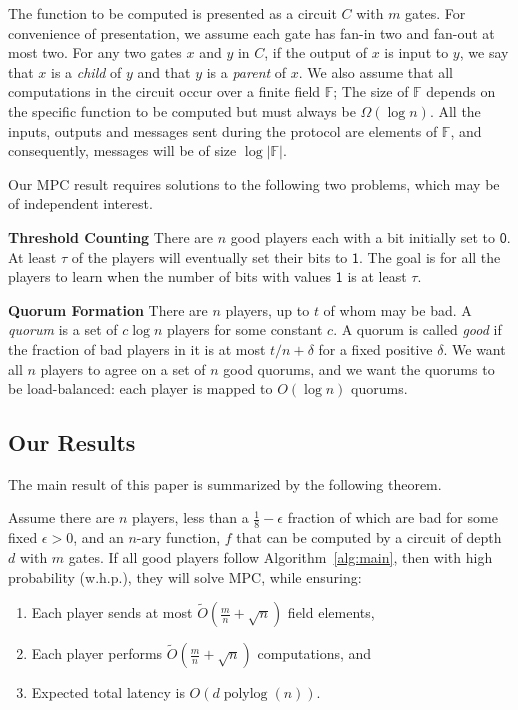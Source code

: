 \documentclass[10pt]{llncs}
\newcommand{\F}{\mathbb{F}}
\newcommand{\whp}{w.h.p.\xspace}
\DeclareMathOperator{\polylog}{polylog}
\newcommand{\fbad}{\frac18\xspace}
\begin{document}
The function to be computed is presented as a circuit $C$ with $m$
gates. For convenience of presentation, we assume each gate has fan-in 
two and fan-out at most two. For any two gates $x$ and $y$ in $C$, if the 
output of $x$ 
is input to $y$, we say that $x$ is a \emph{child} of $y$ and
that $y$ is a \emph{parent} of $x$. We also assume that all
computations in the circuit occur over a finite field $\F$; The size of 
$\F$ depends on the specific function to be computed but must always be 
$\Omega(\log{n})$. All the inputs,
outputs and messages sent during the protocol are elements of $\F$, and 
consequently, messages will be of size $\log|\F|$.



\smallskip
\noindent
Our MPC result requires solutions to the following two problems, which may be of independent interest.

\smallskip
\noindent
{\bf Threshold Counting}  There are $n$ good players each 
with a bit initially set to $\mathsf{0}$. At least $\tau$ of the
players will eventually set their bits to $\mathsf{1}$. The goal is for 
all the players to learn when the number of bits with values $\mathsf{1}$ is at least $\tau$. 


\smallskip
\noindent
{\bf Quorum Formation} There are $n$ players, up to $t$ of whom 
may be bad.
A \emph{quorum} is a set of $c \log{n}$ players for some constant $c$.  
A quorum is called \emph{good} if the fraction of bad players in it is 
at most $t/n+\delta$ for a fixed positive $\delta$. We want all $n$ players to agree on a set of $n$ good quorums, and we want the quorums to be load-balanced: each
player is mapped to $O(\log n)$ quorums.






\subsection{Our Results}



The main result of this paper is summarized by the following theorem.

\begin{theorem} \label{theo:1} 
Assume there are $n$ players, less than a $\fbad-\epsilon$ fraction of which
are bad for some fixed $\epsilon>0$, and an $n$-ary function, $f$ that can be computed by a circuit 
of depth $d$ with $m$ gates. If all good players follow 
Algorithm~\ref{alg:main}, then with high probability (\whp), they will solve MPC, while ensuring:
\begin{enumerate}
\item Each player sends at most $\tilde{O}(\frac{m}{n} + \sqrt n)$
  field elements,
\item Each player performs $\tilde{O}(\frac{m}{n}+ \sqrt n)$ computations, and
\item Expected total latency is $O(d \polylog(n))$.
\end{enumerate}
\end{theorem}
\end{document}
